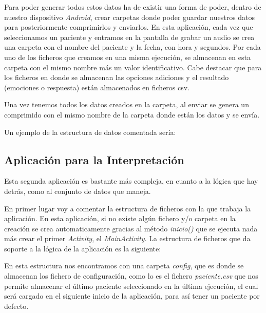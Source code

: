 Para poder generar todos estos datos ha de existir una forma de poder, dentro de nuestro dispositivo \textit{Android}, crear carpetas donde poder guardar nuestros datos para posteriormente comprimirlos y enviarlos. En esta aplicación, cada vez que seleccionamos un paciente y entramos en la pantalla de grabar un audio se crea una carpeta con el nombre del paciente y la fecha, con hora y segundos. Por cada uno de los ficheros que creamos en una misma ejecución, se almacenan en esta carpeta con el mismo nombre más un valor identificativo. Cabe destacar que para los ficheros en donde se almacenan las opciones adiciones y el resultado (emociones o respuesta) están almacenados en ficheros csv.

Una vez tenemos todos los datos creados en la carpeta, al enviar se genera un comprimido con el mismo nombre de la carpeta donde están los datos y se envía.

Un ejemplo de la estructura de datos comentada sería:


\subsection{Aplicación para la Interpretación}
Esta segunda aplicación es bastante más compleja, en cuanto a la lógica que hay detrás, como al conjunto de datos que maneja.

En primer lugar voy a comentar la estructura de ficheros con la que trabaja la aplicación. En esta aplicación, si no existe algún fichero y/o carpeta en la creación se crea automaticamente gracias al método \textit{inicio()} que se ejecuta nada más crear el primer \textit{Activity}, el \textit{MainActivity}. La estructura de ficheros que da soporte a la lógica de la aplicación es la siguiente:


En esta estructura nos encontramos con una carpeta \textit{config}, que es donde se almacenan los fichero de configuración, como lo es el fichero \textit{paciente.csv} que nos permite almacenar el último paciente seleccionado en la última ejecución, el cual será cargado en el siguiente inicio de la aplicación, para así tener un paciente por defecto.

